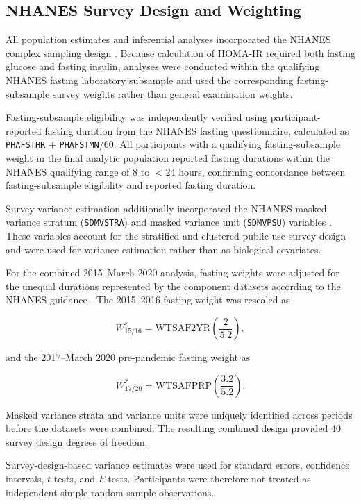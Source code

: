 \documentclass[11pt]{article}
\begin{document}
\subsection{NHANES Survey Design and Weighting}

All population estimates and inferential analyses incorporated the NHANES
complex sampling design \citep{NHANES2017_2020Guidelines}. Because calculation of HOMA-IR required both
fasting glucose and fasting insulin, analyses were conducted within the
qualifying NHANES fasting laboratory subsample and used the corresponding
fasting-subsample survey weights rather than general examination weights.

Fasting-subsample eligibility was independently verified using
participant-reported fasting duration from the NHANES fasting questionnaire,
calculated as \texttt{PHAFSTHR} + \texttt{PHAFSTMN}/60. All participants
with a qualifying fasting-subsample weight in the final analytic population
reported fasting durations within the NHANES qualifying range of 8 to
$<24$ hours, confirming concordance between fasting-subsample eligibility
and reported fasting duration.

Survey variance estimation additionally incorporated the NHANES masked
variance stratum (\texttt{SDMVSTRA}) and masked variance unit
(\texttt{SDMVPSU}) variables \citep{NHANES2017_2020Guidelines}. These variables account for the stratified
and clustered public-use survey design and were used for variance estimation
rather than as biological covariates.

For the combined 2015--March 2020 analysis, fasting weights were adjusted
for the unequal durations represented by the component datasets according to the NHANES guidance \citep{NHANES2017_2020Guidelines}. The
2015--2016 fasting weight was rescaled as

\[
W_{15/16}^{*}
=
\mathrm{WTSAF2YR}
\left(\frac{2}{5.2}\right),
\]

and the 2017--March 2020 pre-pandemic fasting weight as

\[
W_{17/20}^{*}
=
\mathrm{WTSAFPRP}
\left(\frac{3.2}{5.2}\right).
\]

Masked variance strata and variance units were uniquely identified across
periods before the datasets were combined. The resulting combined design
provided 40 survey design degrees of freedom.

Survey-design-based variance estimates were used for standard errors,
confidence intervals, $t$-tests, and $F$-tests. Participants were therefore
not treated as independent simple-random-sample observations.
\end{document}
